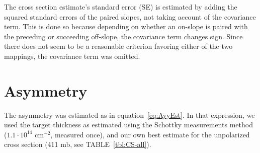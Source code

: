 \documentclass[reprint, superscriptaddress]{revtex4-1}
\begin{document}

The cross section estimate's standard error (SE) is estimated by adding the squared standard errors of the paired slopes, not taking account of the covariance term. This is done so because depending on whether an on-slope is paired with the preceding or succeeding off-slope, the covariance term changes sign. Since there does not seem to be a reasonable criterion favoring either of the two mappings, the covariance term was omitted.

\section{Asymmetry}

The asymmetry was estimated as in equation~\eqref{eq:AyyEst}. In that expression, we used the target thickness as estimated using the Schottky measurements method~\cite{Stein} ($1.1\cdot 10^{14}$ cm$^{-2}$, measured once), and our own best estimate for the unpolarized cross section (411 mb, see TABLE~\ref{tbl:CS-all}).\\
\end{document}
